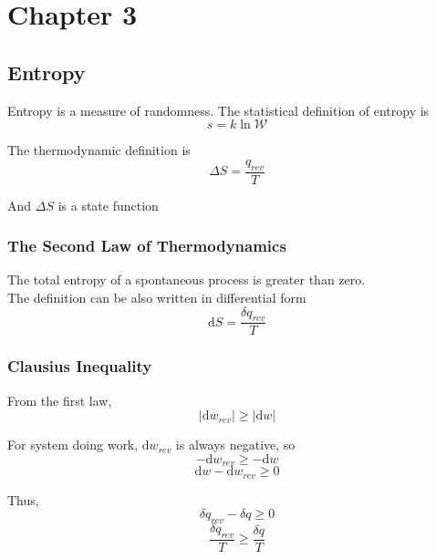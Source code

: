 \documentclass[letterpaper]{article}
\newcommand{\diff}{\mathrm{d}}
\begin{document}
\newpage
\section*{Chapter 3}
\subsection*{Entropy}
Entropy is a measure of randomness. The statistical definition of entropy is
\begin{equation*}
    s=k\ln\mathcal{W}
\end{equation*}

The thermodynamic definition is
\begin{equation*}
    \Delta S=\frac{q_{rev}}{T}
\end{equation*}

And $\Delta S$ is a state function

\subsubsection*{The Second Law of Thermodynamics}
The total entropy of a spontaneous process is greater than zero.\\

The definition can be also written in differential form
\begin{equation*}
    \diff S=\frac{\delta q_{rev}}{T}
\end{equation*}

\subsubsection*{Clausius Inequality}
From the first law,
\begin{equation*}
    |\diff w_{rev}|\geq|\diff w|
\end{equation*}

For system doing work, $\diff w_{rev}$ is always negative, so
\begin{equation*}
    -\diff w_{rev}\geq-\diff w
\end{equation*}
\begin{equation*}
    \diff w - \diff w_{rev}\geq0
\end{equation*}

Thus,
\begin{equation*}
    \delta q_{rev}-\delta q\geq0
\end{equation*}
\begin{equation*}
    \frac{\delta q_{rev}}{T}\geq\frac{\delta q}{T}
\end{equation*}
\end{document}
